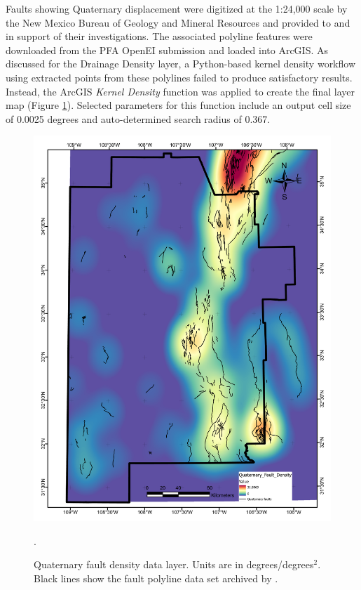Faults showing Quaternary displacement were digitized at the 1:24,000 scale by the New Mexico Bureau of Geology and Mineral Resources and provided to \citet{bielicki_hydrogeolgic_2015} and \citet{pepin_new_2018} in support of their investigations. The associated polyline features were downloaded from the PFA OpenEI submission \citep{kelley_geothermal_2015} and loaded into ArcGIS. As discussed for the Drainage Density layer, a Python-based kernel density workflow using extracted points from these polylines failed to produce satisfactory results. Instead, the ArcGIS \textit{Kernel Density} function was applied to create the final layer map (Figure \ref{fig:feat_qfaults}). Selected parameters for this function include an output cell size of 0.0025 degrees and auto-determined search radius of 0.367.

\begin{figure}[!htp]
\centering
\includegraphics[scale=.50]{templates/images/Figure-QFaultDensity.pdf}
\caption[Quaternary fault density data layer]{Quaternary fault density data layer. Units are in degrees/degrees$^2$. Black lines show the fault polyline data set archived by \protect\citet{bielicki_hydrogeolgic_2015}.}.
\label{fig:feat_qfaults}
\end{figure}

